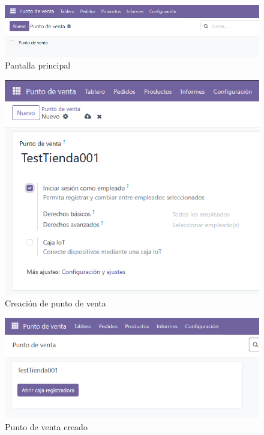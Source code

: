 \documentclass[a4paper,12pt]{article}
\begin{document}
\begin{figure}[h!]
    \centering
    \includegraphics[width=1\textwidth]{pr2odoo48-pantallaPrincipal.png}
    \caption{Pantalla principal}
\end{figure}
\FloatBarrier

\begin{figure}[h!]
    \centering
    \includegraphics[width=1\textwidth]{pr2odoo49-nuevoTPV.png}
    \caption{Creación de punto de venta}
\end{figure}
\FloatBarrier

\begin{figure}[h!]
    \centering
    \includegraphics[width=1\textwidth]{pr2odoo50-tpvCreado.png}
    \caption{Punto de venta creado}
\end{figure}
\FloatBarrier
\end{document}
